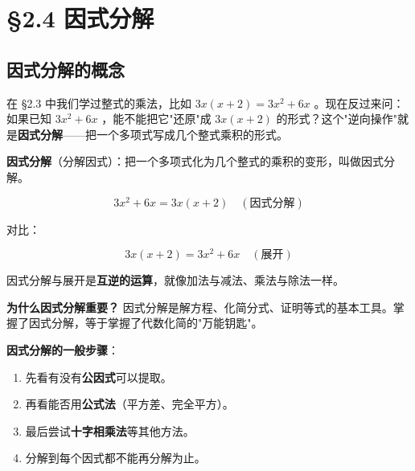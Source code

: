 \chapter{§2.4 因式分解}
\label{sec:2.4}





\section*{因式分解的概念}


\begin{explore}


在 §2.3 中我们学过整式的乘法，比如 $3x(x + 2) = 3x^2 + 6x$ 。现在反过来问：如果已知 $3x^2 + 6x$ ，能不能把它"还原"成 $3x(x + 2)$ 的形式？这个"逆向操作"就是\textbf{因式分解}——把一个多项式写成几个整式乘积的形式。

\end{explore}

\begin{understand}


\textbf{因式分解}（分解因式）：把一个多项式化为几个整式的乘积的变形，叫做因式分解。

\[
3x^2 + 6x = 3x(x + 2) \quad (\text{因式分解})
\]


对比：

\[
3x(x + 2) = 3x^2 + 6x \quad (\text{展开})
\]


因式分解与展开是\textbf{互逆的运算}，就像加法与减法、乘法与除法一样。

\textbf{为什么因式分解重要？} 因式分解是解方程、化简分式、证明等式的基本工具。掌握了因式分解，等于掌握了代数化简的"万能钥匙"。

\textbf{因式分解的一般步骤}：

\begin{enumerate}
  \item 先看有没有\textbf{公因式}可以提取。
  \item 再看能否用\textbf{公式法}（平方差、完全平方）。
  \item 最后尝试\textbf{十字相乘法}等其他方法。
  \item 分解到每个因式都不能再分解为止。
\end{enumerate}


\end{understand}

